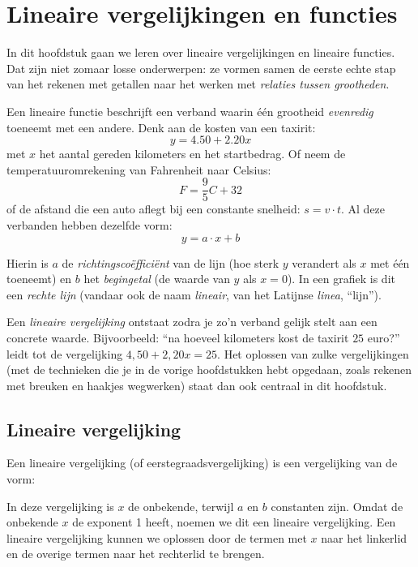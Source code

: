 \chapter{Lineaire vergelijkingen en functies}
\label{chap:functies}

In dit hoofdstuk gaan we leren over lineaire vergelijkingen en lineaire 
functies. Dat zijn niet zomaar losse onderwerpen: ze vormen samen de 
eerste echte stap van het rekenen met getallen naar het werken met 
\emph{relaties tussen grootheden}.

Een lineaire functie beschrijft een verband waarin \'e\'en grootheid 
\emph{evenredig} toeneemt met een andere. Denk aan de kosten van een 
taxirit: 
\[
    y = 4.50 + 2.20x
\]
met $x$ het aantal gereden kilometers en  het startbedrag. Of neem de temperatuuromrekening van Fahrenheit naar Celsius:
\[
    F = \frac{9}{5}C + 32
\]
of de afstand die een auto aflegt bij een constante snelheid: $s = v \cdot t$. Al deze verbanden hebben dezelfde vorm:
\[
    y = a\cdot x + b
\]

Hierin is $a$ de \emph{richtingsco\"effici\"ent} van de lijn (hoe sterk $y$ verandert als $x$ met \'e\'en toeneemt) en 
$b$ het \emph{begingetal} (de waarde van $y$ als $x = 0$). In een 
grafiek is dit een \emph{rechte lijn} (vandaar ook de naam 
\emph{lineair}, van het Latijnse \textit{linea}, ``lijn'').

Een \emph{lineaire vergelijking} ontstaat zodra je zo'n verband 
gelijk stelt aan een concrete waarde. Bijvoorbeeld: ``na hoeveel 
kilometers kost de taxirit $25$ euro?'' leidt tot de vergelijking 
$4{,}50 + 2{,}20x = 25$. Het oplossen van zulke vergelijkingen (met 
de technieken die je in de vorige hoofdstukken hebt opgedaan, zoals 
rekenen met breuken en haakjes wegwerken) staat dan ook centraal in 
dit hoofdstuk.

\section{Lineaire vergelijking}
Een lineaire vergelijking (of eerstegraadsvergelijking) is een vergelijking van de vorm:


In deze vergelijking is $x$ de onbekende, terwijl $a$ en $b$ constanten zijn. Omdat de onbekende $x$ de exponent 1 heeft, noemen we dit een lineaire vergelijking. Een lineaire vergelijking kunnen we oplossen door de termen met $x$ naar het linkerlid en de overige termen naar het rechterlid te brengen.

